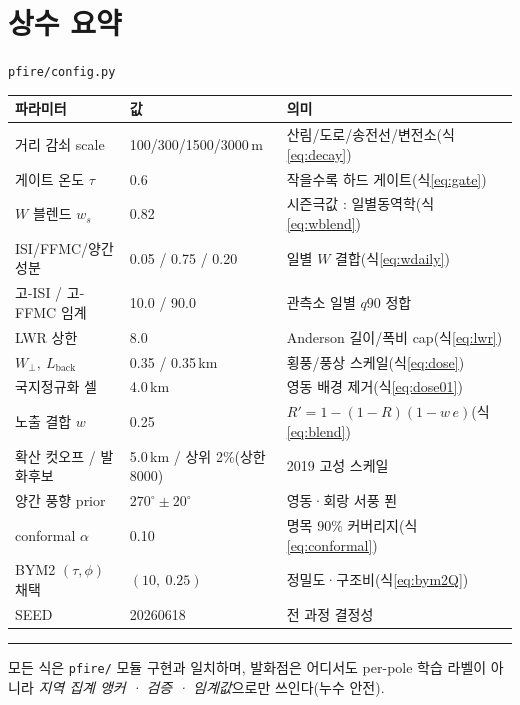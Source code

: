 \documentclass[11pt,a4paper]{article}
\newcommand{\src}[1]{{\footnotesize\color{gray}\texttt{#1}}}
\begin{document}
\appendix
\section{상수 요약}
\src{pfire/config.py}
\begin{center}
\small
\begin{tabular}{lll}
\toprule
파라미터 & 값 & 의미 \\
\midrule
거리 감쇠 scale & 100/300/1500/3000\,m & 산림/도로/송전선/변전소(식\ref{eq:decay}) \\
게이트 온도 $\tau$ & 0.6 & 작을수록 하드 게이트(식\ref{eq:gate}) \\
$W$ 블렌드 $w_s$ & 0.82 & 시즌극값 : 일별동역학(식\ref{eq:wblend}) \\
ISI/FFMC/양간 성분 & 0.05 / 0.75 / 0.20 & 일별 $W$ 결합(식\ref{eq:wdaily}) \\
고-ISI / 고-FFMC 임계 & 10.0 / 90.0 & 관측소 일별 $q90$ 정합 \\
LWR 상한 & 8.0 & Anderson 길이/폭비 cap(식\ref{eq:lwr}) \\
$W_\perp,\ L_{\text{back}}$ & 0.35 / 0.35\,km & 횡풍/풍상 스케일(식\ref{eq:dose}) \\
국지정규화 셀 & 4.0\,km & 영동 배경 제거(식\ref{eq:dose01}) \\
노출 결합 $w$ & 0.25 & $R'=1-(1-R)(1-w\,e)$(식\ref{eq:blend}) \\
확산 컷오프 / 발화후보 & 5.0\,km / 상위 2\%(상한 8000) & 2019 고성 스케일 \\
양간 풍향 prior & $270^\circ\!\pm\!20^\circ$ & 영동·회랑 서풍 푄 \\
conformal $\alpha$ & 0.10 & 명목 90\% 커버리지(식\ref{eq:conformal}) \\
BYM2 $(\tau,\phi)$ 채택 & $(10,\ 0.25)$ & 정밀도·구조비(식\ref{eq:bym2Q}) \\
SEED & 20260618 & 전 과정 결정성 \\
\bottomrule
\end{tabular}
\end{center}

\vspace{6pt}\hrule\vspace{4pt}
{\footnotesize 모든 식은 \texttt{pfire/} 모듈 구현과 일치하며, 발화점은 어디서도 per-pole 학습
라벨이 아니라 \emph{지역 집계 앵커 · 검증 · 임계값}으로만 쓰인다(누수 안전).}
\end{document}
